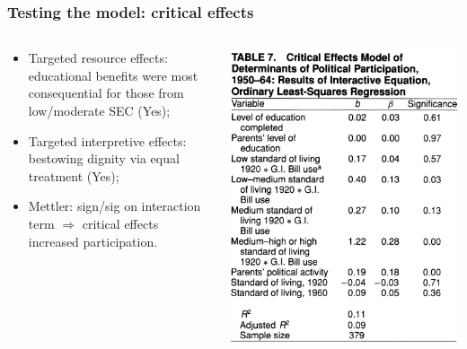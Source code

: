 \documentclass[aspectratio=169]{beamer}
\theoremstyle{principle}
\begin{document}
\begin{frame}
\frametitle{Testing the model: critical effects}
\begin{columns}
\begin{column}{0.5\textwidth}

\begin{itemize}
\item Targeted resource effects: educational benefits were most consequential for those from low/moderate SEC (Yes);
\bigskip
\bigskip
\item Targeted interpretive effects: bestowing dignity via equal treatment (Yes);
\bigskip
\bigskip
\item Mettler: sign/sig on interaction term $\Rightarrow$ critical effects increased participation.
\end{itemize}
\end{column}
\begin{column}{0.5\textwidth}
\begin{center}
\includegraphics[scale=0.35]{table_7.png}
\end{center}
\end{column}
\end{columns}

\end{frame}
\end{document}
